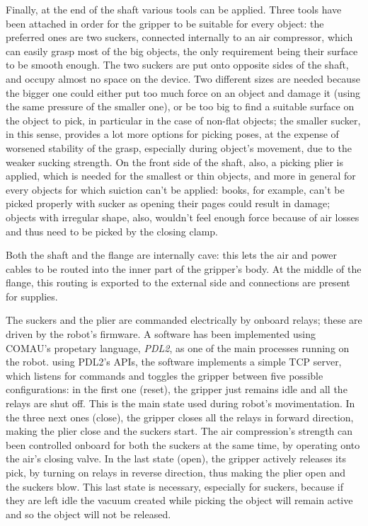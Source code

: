 Finally, at the end of the shaft various tools can be applied. Three
tools have been attached in order for the gripper to be suitable for every
object: the preferred ones are two suckers, connected internally to an air
compressor, which can easily grasp most of the big objects, the only
requirement being their surface to be smooth enough. The two suckers are put
onto opposite sides of the shaft, and occupy almost no space on the device. Two
different sizes are needed because  the bigger one could either put too much
force on an object and damage it (using the same pressure of the smaller one),
or be too big to find a suitable surface on the object to pick, in particular
in the case of non-flat objects; the smaller sucker, in this sense, provides a
lot more options for picking poses, at the expense of worsened stability of
the grasp, especially during object's movement, due to the weaker sucking
strength. On the front side of the shaft, also, a picking plier is applied,
which is needed for the smallest or thin objects, and more in general for
every objects for which suiction can't be applied: books, for example, can't be
picked properly with sucker as opening their pages could result in damage;
objects with irregular shape, also, wouldn't feel enough force because of air
losses and thus need to be picked by the closing clamp.

Both the shaft and the flange are internally cave: this lets the air and power
cables to be routed into the inner part of the gripper's body. At the middle of
the flange, this routing is exported to the external side and connections are
present for supplies.

The suckers and the plier are commanded electrically by onboard relays; these
are driven by the robot's firmware. A software has been implemented using
COMAU's propetary language, \emph{PDL2}, as one of the main processes running on the
robot. using PDL2's APIs, the software implements a simple TCP server, which
listens for commands and toggles the gripper between five possible
configurations: in the first one (reset), the gripper just remains idle and all
the relays are shut off. This is the main state used during robot's
movimentation. In the three next ones (close), the gripper closes all the relays
in forward direction, making the plier close and the suckers start. The air
compression's strength can been controlled onboard for both the suckers at the
same time, by operating onto the air's closing valve. In the last state (open),
the gripper actively releases its pick, by turning on relays in reverse
direction, thus making the plier open and the suckers blow. This last state  is
necessary, especially for suckers, because if they are left idle the vacuum
created while picking the object will remain active and so the object will not
be released.

